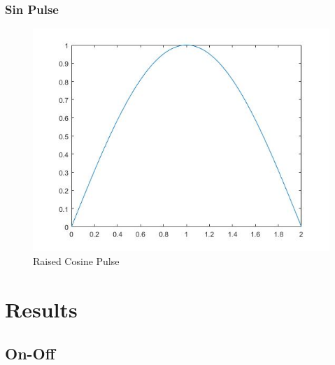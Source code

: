 \documentclass{article}
\begin{document}
\subsubsection{Sin Pulse}
\begin{figure}[H]
  \begin{center}
    \includegraphics[width = \linewidth]{Sin_Pulse.jpg}
    \caption{Raised Cosine Pulse}
    \label{fig:Sin-Pulse}
  \end{center}
\end{figure}
\section{Results}
\subsection{On-Off}
\end{document}
